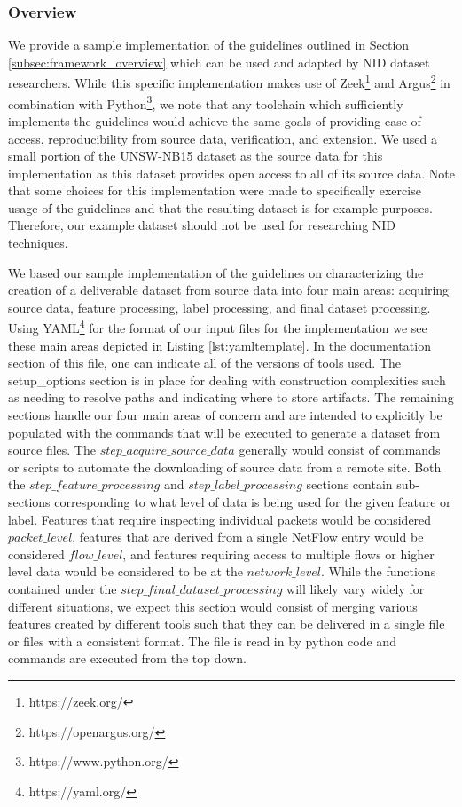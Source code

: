 \documentclass[sigconf]{acmart}
\begin{document}
\subsubsection{Overview}\label{subsubsec:sample_overview}
We provide a sample implementation of the guidelines outlined in Section \ref{subsec:framework_overview} which can be used and adapted by NID dataset researchers.
While this specific implementation makes use of Zeek\footnote{https://zeek.org/} and Argus\footnote{https://openargus.org/} in combination with Python\footnote{https://www.python.org/}, we note that any toolchain which sufficiently implements the guidelines would achieve the same goals of providing ease of access, reproducibility from source data, verification, and extension.
We used a small portion of the UNSW-NB15 dataset \cite{unswnb15} as the source data for this implementation as this dataset provides open access to all of its source data.
Note that some choices for this implementation were made to specifically exercise usage of the guidelines and that the resulting dataset is for example purposes.
Therefore, our example dataset should not be used for researching NID techniques.

We based our sample implementation of the guidelines on characterizing the creation of a deliverable dataset from source data into four main areas:  acquiring source data, feature processing, label processing, and final dataset processing.
Using YAML\footnote{https://yaml.org/} for the format of our input files for the implementation we see these main areas depicted in Listing \ref{lst:yamltemplate}.
In the documentation section of this file, one can indicate all of the versions of tools used.
The setup\_options section is in place for dealing with construction complexities such as needing to resolve paths and indicating where to store artifacts.
The remaining sections handle our four main areas of concern and are intended to explicitly be populated with the commands that will be executed to generate a dataset from source files.
The $step\_acquire\_source\_data$ generally would consist of commands or scripts to automate the downloading of source data from a remote site.
Both the $step\_feature\_processing$ and $step\_label\_processing$ sections contain sub-sections corresponding to what level of data is being used for the given feature or label.
Features that require inspecting individual packets would be considered $packet\_level$, features that are derived from a single NetFlow entry would be considered $flow\_level$, and features requiring access to multiple flows or higher level data would be considered to be at the $network\_level$.
While the functions contained under the $step\_final\_dataset\_processing$ will likely vary widely for different situations, we expect this section would consist of merging various features created by different tools such that they can be delivered in a single file or files with a consistent format.
The file is read in by python code and commands are executed from the top down.
\end{document}
